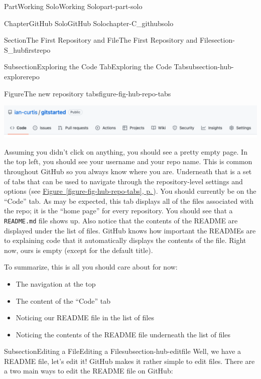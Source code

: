 \documentclass[twoside,10pt,]{book}
\newcommand{\xreffont}{\relax}
\newcommand{\mono}[1]{\texttt{#1}}
\begin{document}
\begin{partptx}{Part}{Working Solo}{}{Working Solo}{}{}{part-part-solo}
\begin{chapterptx}{Chapter}{GitHub Solo}{}{GitHub Solo}{}{}{chapter-C_githubsolo}
\begin{sectionptx}{Section}{The First Repository and File}{}{The First Repository and File}{}{}{section-S_hubfirstrepo}
\begin{subsectionptx}{Subsection}{Exploring the Code Tab}{}{Exploring the Code Tab}{}{}{subsection-hub-explorerepo}
\begin{figureptx}{Figure}{The new repository tabs}{figure-fig-hub-repo-tabs}{}
\begin{image}{0.1}{0.8}{0.1}{}%
\includegraphics[width=\linewidth]{external/hub_repo_tabs.pdf}
\end{image}%
\tcblower
\end{figureptx}%
Assuming you didn't click on anything, you should see a pretty empty page. In the top left, you should see your username and your repo name. This is common throughout GitHub so you always know where you are. Underneath that is a set of tabs that can be used to navigate through the repository-level settings and options (see \hyperref[figure-fig-hub-repo-tabs]{Figure~{\xreffont\ref{figure-fig-hub-repo-tabs}}, p.\,\pageref{figure-fig-hub-repo-tabs}}). You should currently be on the ``Code'' tab. As may be expected, this tab displays all of the files associated with the repo; it is the ``home page'' for every repository. You should see that a \mono{README.md} file shows up. Also notice that the contents of the README are displayed under the list of files. GitHub knows how important the READMEs are to explaining code that it automatically displays the contents of the file. Right now, ours is empty (except for the default title).%
\par
To summarize, this is all you should care about for now:%
\begin{itemize}[label=\textbullet]
\item{}The navigation at the top%
\item{}The content of the ``Code'' tab%
\item{}Noticing our README file in the list of files%
\item{}Noticing the contents of the README file underneath the list of files%
\end{itemize}
%
\end{subsectionptx}
%
%
\typeout{************************************************}
\typeout{************************************************}
%
\begin{subsectionptx}{Subsection}{Editing a File}{}{Editing a File}{}{}{subsection-hub-editfile}
%
Well, we have a README file, let's edit it! GitHub makes it rather simple to edit files. There are a two main ways to edit the README file on GitHub:%
\begin{enumerate}

\end{enumerate}
\end{subsectionptx}
\end{sectionptx}
\end{chapterptx}
\end{partptx}
\end{document}
